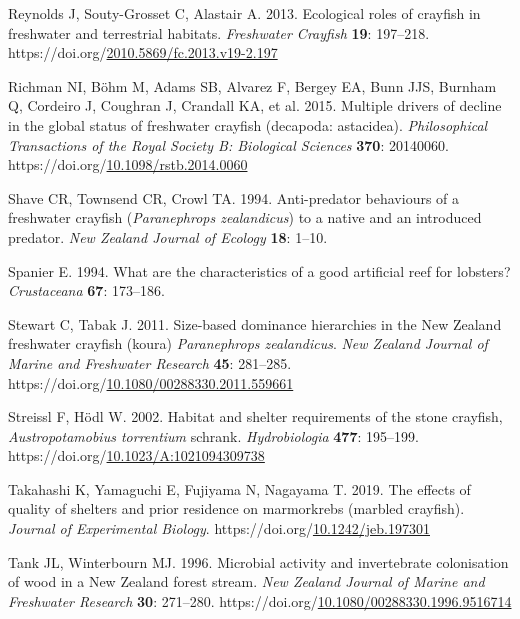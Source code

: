 \documentclass[
  letterpaper,
  DIV=11,
  numbers=noendperiod]{scrartcl}
\newlength{\cslhangindent}
\newenvironment{CSLReferences}[2] %
 {\begin{list}{}{%
  \setlength{\itemindent}{0pt}
  \setlength{\leftmargin}{0pt}
  \setlength{\parsep}{0pt}
  \ifodd #1
   \setlength{\leftmargin}{\cslhangindent}
   \setlength{\itemindent}{-1\cslhangindent}
  \fi
  \setlength{\itemsep}{#2\baselineskip}}}
 {\end{list}}
\begin{document}
\begin{CSLReferences}{1}{0}
Reynolds J, Souty-Grosset C, Alastair A. 2013. Ecological roles of
crayfish in freshwater and terrestrial habitats. \emph{Freshwater
Crayfish} \textbf{19}: 197--218.
https://doi.org/\href{https://doi.org/2010.5869/fc.2013.v19-2.197}{2010.5869/fc.2013.v19-2.197}

Richman NI, Böhm M, Adams SB, Alvarez F, Bergey EA, Bunn JJS, Burnham Q,
Cordeiro J, Coughran J, Crandall KA, et al. 2015. Multiple drivers of
decline in the global status of freshwater crayfish (decapoda:
astacidea). \emph{Philosophical Transactions of the Royal Society B:
Biological Sciences} \textbf{370}: 20140060.
https://doi.org/\href{https://doi.org/10.1098/rstb.2014.0060}{10.1098/rstb.2014.0060}

Shave CR, Townsend CR, Crowl TA. 1994. Anti-predator behaviours of a
freshwater crayfish ({\emph{Paranephrops zealandicus}}) to a native and
an introduced predator. \emph{New Zealand Journal of Ecology}
\textbf{18}: 1--10.

Spanier E. 1994. What are the characteristics of a good artificial reef
for lobsters? \emph{Crustaceana} \textbf{67}: 173--186.

Stewart C, Tabak J. 2011. Size‐based dominance hierarchies in the {New
Zealand} freshwater crayfish (koura) {\emph{Paranephrops zealandicus}}.
\emph{New Zealand Journal of Marine and Freshwater Research}
\textbf{45}: 281--285.
https://doi.org/\href{https://doi.org/10.1080/00288330.2011.559661}{10.1080/00288330.2011.559661}

Streissl F, Hödl W. 2002. Habitat and shelter requirements of the stone
crayfish, {\emph{Austropotamobius torrentium}} schrank.
\emph{Hydrobiologia} \textbf{477}: 195--199.
https://doi.org/\href{https://doi.org/10.1023/A:1021094309738}{10.1023/A:1021094309738}

Takahashi K, Yamaguchi E, Fujiyama N, Nagayama T. 2019. The effects of
quality of shelters and prior residence on marmorkrebs (marbled
crayfish). \emph{Journal of Experimental Biology}.
https://doi.org/\href{https://doi.org/10.1242/jeb.197301}{10.1242/jeb.197301}

Tank JL, Winterbourn MJ. 1996. Microbial activity and invertebrate
colonisation of wood in a {New Zealand} forest stream. \emph{New Zealand
Journal of Marine and Freshwater Research} \textbf{30}: 271--280.
https://doi.org/\href{https://doi.org/10.1080/00288330.1996.9516714}{10.1080/00288330.1996.9516714}


\end{CSLReferences}
\end{document}
